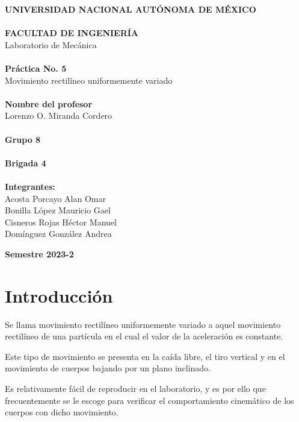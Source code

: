 \documentclass[12pt, titlepage]{report}
\begin{document}
\begin{titlepage}
\begin{center}
            \large \textbf{UNIVERSIDAD NACIONAL AUTÓNOMA DE MÉXICO\\}
            \textbf{\\FACULTAD DE INGENIERÍA\\} 
            \hfill \break
            Laboratorio de Mecánica\\
            \Large \textbf{\\Práctica No. 5\\}
            \large Movimiento rectilíneo uniformemente variado\\
            \Large \textbf{\\Nombre del profesor\\}
            \large Lorenzo O. Miranda Cordero\\
            \Large \textbf{\\Grupo 8\\}
            \textbf{\\Brigada 4\\}
            \textbf{\\Integrantes:\\}
            Acosta Porcayo Alan Omar\\
            Bonilla López Mauricio Gael\\
            Cisneros Rojas Héctor Manuel\\
            Domínguez González Andrea\\
        \end{center}
        \begin{flushright}
            \Large \textbf{Semestre 2023-2}
        \end{flushright}
    \end{titlepage}

    \section*{Introducción}
    Se llama movimiento rectilíneo uniformemente variado a aquel movimiento rectilíneo de una partícula en el cual el valor de la aceleración es constante.

    Este tipo de movimiento se presenta en la caída libre, el tiro vertical y en el movimiento de cuerpos bajando por un plano inclinado.

    Es relativamente fácil de reproducir en el laboratorio, y es por ello que frecuentemente se le escoge para verificar el comportamiento cinemático de los cuerpos con dicho movimiento.
\end{document}
